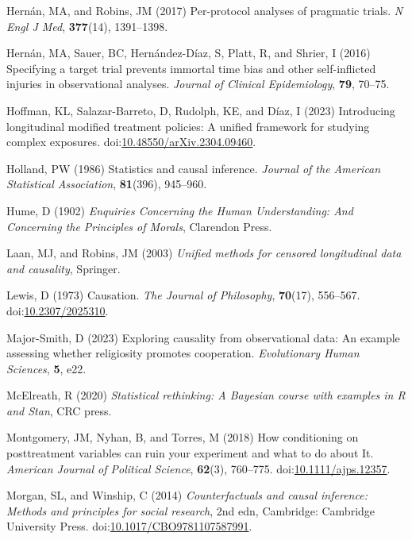 \documentclass[
  singlecolumn]{article}
\newlength{\cslhangindent}
\newenvironment{CSLReferences}[2] %
 {\begin{list}{}{%
  \setlength{\itemindent}{0pt}
  \setlength{\leftmargin}{0pt}
  \setlength{\parsep}{0pt}
  \ifodd #1
   \setlength{\leftmargin}{\cslhangindent}
   \setlength{\itemindent}{-1\cslhangindent}
  \fi
  \setlength{\itemsep}{#2\baselineskip}}}
 {\end{list}}
\begin{document}
\begin{CSLReferences}{1}{0}
Hernán, MA, and Robins, JM (2017) Per-protocol analyses of pragmatic
trials. \emph{N Engl J Med}, \textbf{377}(14), 1391--1398.

Hernán, MA, Sauer, BC, Hernández-Díaz, S, Platt, R, and Shrier, I (2016)
Specifying a target trial prevents immortal time bias and other
self-inflicted injuries in observational analyses. \emph{Journal of
Clinical Epidemiology}, \textbf{79}, 70--75.

Hoffman, KL, Salazar-Barreto, D, Rudolph, KE, and Díaz, I (2023)
Introducing longitudinal modified treatment policies: A unified
framework for studying complex exposures.
doi:\href{https://doi.org/10.48550/arXiv.2304.09460}{10.48550/arXiv.2304.09460}.

Holland, PW (1986) Statistics and causal inference. \emph{Journal of the
American Statistical Association}, \textbf{81}(396), 945--960.

Hume, D (1902) \emph{Enquiries Concerning the Human Understanding: And
Concerning the Principles of Morals}, Clarendon Press.

Laan, MJ, and Robins, JM (2003) \emph{Unified methods for censored
longitudinal data and causality}, Springer.

Lewis, D (1973) Causation. \emph{The Journal of Philosophy},
\textbf{70}(17), 556--567.
doi:\href{https://doi.org/10.2307/2025310}{10.2307/2025310}.

Major-Smith, D (2023) Exploring causality from observational data: An
example assessing whether religiosity promotes cooperation.
\emph{Evolutionary Human Sciences}, \textbf{5}, e22.

McElreath, R (2020) \emph{Statistical rethinking: A {B}ayesian course
with examples in {R} and {S}tan}, CRC press.

Montgomery, JM, Nyhan, B, and Torres, M (2018) How conditioning on
posttreatment variables can ruin your experiment and what to do about
It. \emph{American Journal of Political Science}, \textbf{62}(3),
760--775.
doi:\href{https://doi.org/10.1111/ajps.12357}{10.1111/ajps.12357}.

Morgan, SL, and Winship, C (2014) \emph{Counterfactuals and causal
inference: Methods and principles for social research}, 2nd edn,
Cambridge: Cambridge University Press.
doi:\href{https://doi.org/10.1017/CBO9781107587991}{10.1017/CBO9781107587991}.


\end{CSLReferences}
\end{document}
